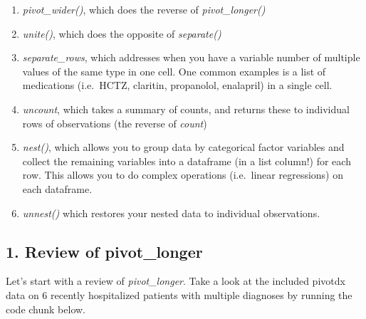 \documentclass[
]{book}
\providecommand{\tightlist}{%
  \setlength{\itemsep}{0pt}\setlength{\parskip}{0pt}}
\begin{document}
\begin{enumerate}
\def\labelenumi{\arabic{enumi}.}
\tightlist
\item
  \emph{pivot\_wider()}, which does the reverse of \emph{pivot\_longer()}
\item
  \emph{unite()}, which does the opposite of \emph{separate()}
\item
  \emph{separate\_rows}, which addresses when you have a variable number of multiple values of the same type in one cell. One common examples is a list of medications (i.e.~HCTZ, claritin, propanolol, enalapril) in a single cell.
\item
  \emph{uncount}, which takes a summary of counts, and returns these to individual rows of observations (the reverse of \emph{count})
\item
  \emph{nest()}, which allows you to group data by categorical factor variables and collect the remaining variables into a dataframe (in a list column!) for each row. This allows you to do complex operations (i.e.~linear regressions) on each dataframe.
\item
  \emph{unnest()} which restores your nested data to individual observations.
\end{enumerate}

\hypertarget{review-of-pivot_longer}{%
\subsection{1. Review of pivot\_longer}\label{review-of-pivot_longer}}

Let's start with a review of \emph{pivot\_longer}. Take a look at the included pivotdx data on 6 recently hospitalized patients with multiple diagnoses by running the code chunk below.
\end{document}
